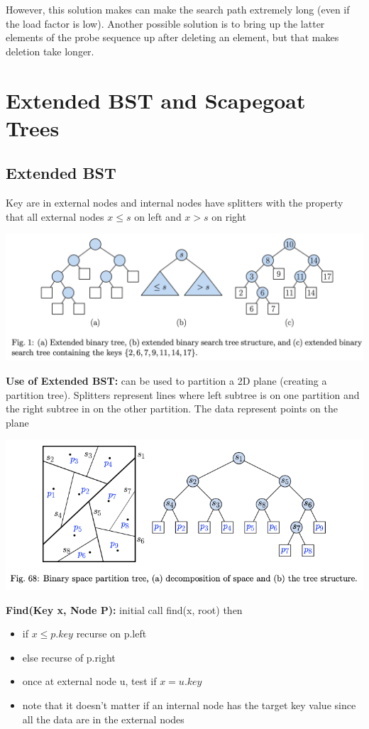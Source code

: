 \documentclass{article}
\begin{document}
  However, this solution makes can make the search path extremely long (even if the load factor is low). Another possible solution is to bring up the latter elements of the probe sequence up after deleting an element, but that makes deletion take longer.\\
  \newpage
  \section{Extended BST and Scapegoat Trees}
  \subsection{Extended BST}
  Key are in external nodes and internal nodes have splitters with the property that all external nodes $x \leq s$ on left and $x > s$ on right
  \begin{center}
  \includegraphics[scale=0.15]{ExtendedBST}
  \end{center}
  \textbf{Use of Extended BST: } can be used to partition a 2D plane (creating a partition tree). Splitters represent lines where left subtree is on one partition and the right subtree in on the other partition. The data represent points on the plane
  \begin{center}
    \includegraphics{PartitionTree}
  \end{center}
  \textbf{Find(Key x, Node P): }initial call find(x, root) then 
  \begin{itemize}[noitemsep]
    \item if $x \leq p.key$ recurse on p.left
    \item else recurse of p.right
    \item once at external node u, test if $x = u.key$
    \item note that it doesn't matter if an internal node has the target key value since all the data are in the external nodes \\
  \end{itemize}
\end{document}
